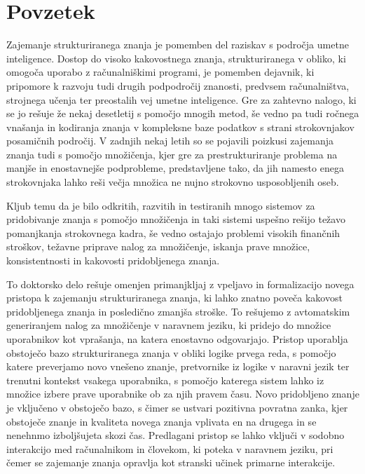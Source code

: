 % 
\chapter*{Povzetek}

Zajemanje strukturiranega znanja je pomemben del raziskav s področja umetne
inteligence. Dostop do visoko kakovostnega znanja, strukturiranega v obliko, ki omogoča uporabo z računalniškimi programi, je pomemben dejavnik, ki pripomore k razvoju tudi drugih podpodročij znanosti, predvsem računalništva, strojnega učenja ter preostalih vej umetne inteligence. Gre za zahtevno nalogo, ki se jo
rešuje že nekaj desetletij s pomočjo mnogih metod, še vedno pa tudi ročnega vnašanja in kodiranja znanja v kompleksne baze podatkov s strani strokovnjakov
posamičnih področij. V zadnjih nekaj letih so se pojavili poizkusi zajemanja
znanja tudi s pomočjo množičenja, kjer gre za prestrukturiranje problema na
manjše in enostavnejše podprobleme, predstavljene tako, da jih namesto enega strokovnjaka lahko reši večja množica ne nujno strokovno usposobljenih oseb.

Kljub temu da je bilo odkritih, razvitih in testiranih mnogo sistemov za pridobivanje znanja s pomočjo množičenja in taki sistemi uspešno rešijo težavo pomanjkanja strokovnega kadra, še vedno ostajajo problemi visokih finančnih stroškov, težavne priprave nalog za množičenje, iskanja prave množice, konsistentnosti in kakovosti pridobljenega znanja.

To doktorsko delo rešuje omenjen primanjkljaj z vpeljavo in formalizacijo novega pristopa k zajemanju strukturiranega znanja, ki lahko znatno poveča kakovost pridobljenega znanja in posledično zmanjša stroške. To rešujemo z
avtomatskim generiranjem nalog za množičenje v naravnem jeziku, ki pridejo do množice uporabnikov kot vprašanja, na katera enostavno odgovarjajo. Pristop
uporablja obstoječo bazo strukturiranega znanja v obliki logike prvega reda, s
pomočjo katere preverjamo novo vnešeno znanje, pretvornike iz logike v naravni jezik ter trenutni kontekst vsakega uporabnika, s pomočjo katerega sistem lahko
iz množice izbere prave uporabnike ob za njih pravem času. Novo pridobljeno znanje je vključeno v obstoječo bazo, s čimer se ustvari pozitivna povratna zanka, kjer obstoječe znanje in kvaliteta novega znanja vplivata en na drugega in se nenehnmo izboljšujeta skozi čas. Predlagani pristop se lahko vključi v sodobno interakcijo med računalnikom in človekom, ki poteka v naravnem jeziku,
pri čemer se zajemanje znanja opravlja kot stranski učinek primarne interakcije.

